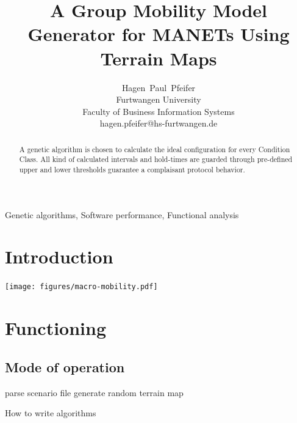 \documentclass[journal]{IEEEtran}
\begin{document}
\newcommand{\ra}[1]{\renewcommand{\arraystretch}{#1}}

\title{A Group Mobility Model Generator for MANETs Using Terrain Maps}

\author{Hagen~Paul~Pfeifer\\Furtwangen University\\Faculty of Business
Information Systems\\hagen.pfeifer@hs-furtwangen.de}



\maketitle


\begin{abstract}
A genetic algorithm is chosen to calculate the ideal configuration for every
Condition Class. All kind of calculated intervals and hold-times are guarded
through pre-defined upper and lower thresholds guarantee a complaisant protocol
behavior.
\end{abstract}

% 
\begin{keywords}
Genetic algorithms, Software performance, Functional analysis
\end{keywords}
% 
\IEEEpeerreviewmaketitle


\section{Introduction}


\texttt{[image: figures/macro-mobility.pdf]}

\section{Functioning}


\subsection{Mode of operation}

\begin{algorithm}[H]
  \SetLine
  parse scenario file\;
	generate random terrain map\;
  \caption{How to write algorithms}
\end{algorithm}
\end{document}

